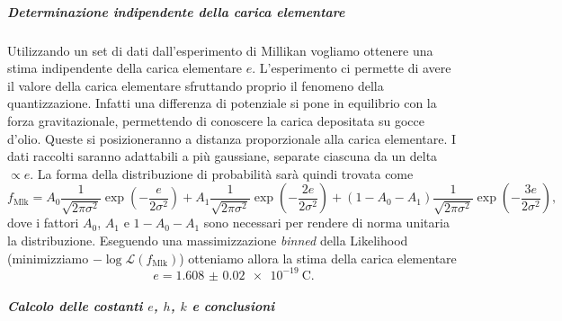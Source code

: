 \documentclass[a4paper, varvw, nofootinbib]{revtex4-2}
\begin{document}
\subparagraph*{Determinazione indipendente della carica elementare}\label{sec:millikan} Utilizzando un set di dati dall'esperimento di Millikan vogliamo ottenere una stima indipendente della carica elementare $e$. L'esperimento ci permette di avere il valore della carica elementare sfruttando proprio il fenomeno della quantizzazione. Infatti una differenza di potenziale si pone in equilibrio con la forza gravitazionale, permettendo di conoscere la carica depositata su gocce d'olio. Queste si posizioneranno a distanza proporzionale alla carica elementare. I dati raccolti saranno adattabili a più gaussiane, separate ciascuna da un delta $\propto e$. La forma della distribuzione di probabilità sarà quindi trovata come \begin{equation} f_\text{Mlk} =  A_0 \frac{1}{\sqrt{2\pi\sigma^2}}\exp({-\frac{e}{2\sigma^2}}) +  A_1 \frac{1}{\sqrt{2\pi\sigma^2}}\exp({-\frac{2e}{2\sigma^2}}) + (1-A_0-A_1) \frac{1}{\sqrt{2\pi\sigma^2}}\exp({-\frac{3e}{2\sigma^2}}), \label{eq:6}\end{equation} dove i fattori $A_0$, $A_1$ e $1-A_0-A_1$ sono necessari per rendere di norma unitaria la distribuzione. Eseguendo una massimizzazione \emph{binned} della Likelihood (minimizziamo $-\log \mathcal L(f_\text{Mlk})$) otteniamo allora la stima della carica elementare \[e = \SI{1.608(20)e-19}{\coulomb}.\] 

\subparagraph*{Calcolo delle costanti $e$, $h$, $k$ e conclusioni}\label{sec:combined_data} 


\end{document}
